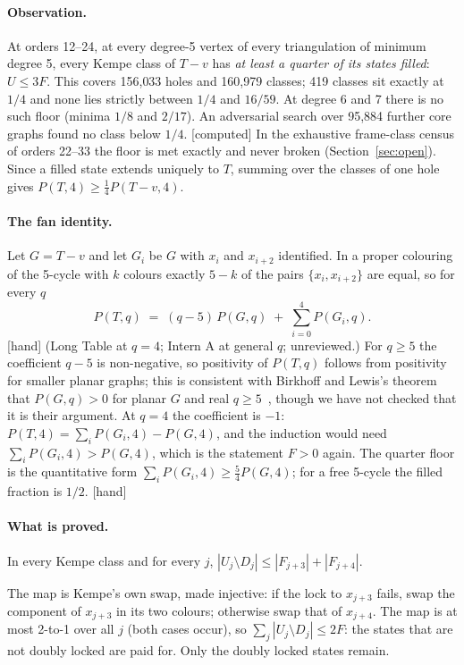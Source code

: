 \documentclass[11pt]{article}
\newcommand{\lab}[1]{\textsf{[#1]}}
\begin{document}
\paragraph{Observation.} At orders 12--24, at every degree-5 vertex of every triangulation of minimum degree 5, every Kempe class of $T-v$ has \emph{at least a quarter of its states filled}: $U\le 3F$. This covers 156{,}033 holes and 160{,}979 classes; 419 classes sit exactly at $1/4$ and none lies strictly between $1/4$ and $16/59$. At degree 6 and 7 there is no such floor (minima $1/8$ and $2/17$). An adversarial search over 95{,}884 further core graphs found no class below $1/4$. \lab{computed} In the exhaustive frame-class census of orders 22--33 the floor is met exactly and never broken (Section~\ref{sec:open}).
Since a filled state extends uniquely to $T$, summing over the classes of one hole gives $P(T,4)\ge\frac14P(T-v,4)$.

\paragraph{The fan identity.} Let $G=T-v$ and let $G_i$ be $G$ with $x_i$ and $x_{i+2}$ identified. In a proper colouring of the 5-cycle with $k$ colours exactly $5-k$ of the pairs $\{x_i,x_{i+2}\}$ are equal, so for every $q$
\[P(T,q)\;=\;(q-5)\,P(G,q)\;+\;\sum_{i=0}^{4}P(G_i,q).\]
\lab{hand} (Long Table at $q=4$; Intern A at general $q$; unreviewed.) For $q\ge5$ the coefficient $q-5$ is non-negative, so positivity of $P(T,q)$ follows from positivity for smaller planar graphs; this is consistent with Birkhoff and Lewis's theorem that $P(G,q)>0$ for planar $G$ and real $q\ge5$~\cite{birkhoff1946}, though we have not checked that it is their argument. At $q=4$ the coefficient is $-1$: $P(T,4)=\sum_iP(G_i,4)-P(G,4)$, and the induction would need $\sum_iP(G_i,4)>P(G,4)$, which is the statement $F>0$ again. The quarter floor is the quantitative form $\sum_iP(G_i,4)\ge\frac54P(G,4)$; for a free 5-cycle the filled fraction is $1/2$. \lab{hand}

\paragraph{What is proved.}
\begin{lemma}[\lab{hand}, audited: correct per $j$]\label{lem:quarterA}
In every Kempe class and for every $j$, $|U_j\setminus D_j|\le|F_{j+3}|+|F_{j+4}|$.
\end{lemma}
The map is Kempe's own swap, made injective: if the lock to $x_{j+3}$ fails, swap the component of $x_{j+3}$ in its two colours; otherwise swap that of $x_{j+4}$. The map is at most 2-to-1 over all $j$ (both cases occur), so $\sum_j|U_j\setminus D_j|\le2F$: the states that are not doubly locked are paid for. Only the doubly locked states remain.
\end{document}
